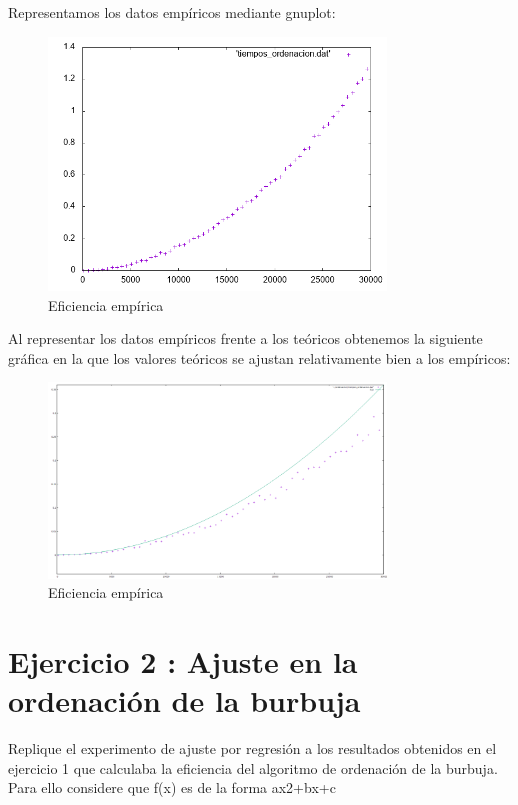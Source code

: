 \documentclass{article}
\begin{document}
	Representamos los datos emp\'iricos mediante gnuplot:
	\begin{figure}[H]
  		\caption{Eficiencia emp\'irica}
  		\centering
  		\includegraphics[width=0.8\textwidth]{ejer1/grafica.png}
	\end{figure}
	\clearpage
	Al representar los datos empíricos frente a los teóricos obtenemos la siguiente gráfica en la que los valores teóricos se ajustan relativamente bien a los empíricos:
	\begin{figure}[H]
  		\caption{Eficiencia emp\'irica}
  		\centering
  		\includegraphics[width=0.8\textwidth]{ejer1/grafica2.png}
	\end{figure}



\clearpage
\section{Ejercicio 2 : Ajuste en la ordenación de la burbuja}
Replique el experimento de ajuste por regresión a los resultados obtenidos en el ejercicio 1 que calculaba la eficiencia del algoritmo de ordenación de la burbuja. Para ello considere que f(x) es de la forma ax2+bx+c
\vspace{10mm}
\end{document}
